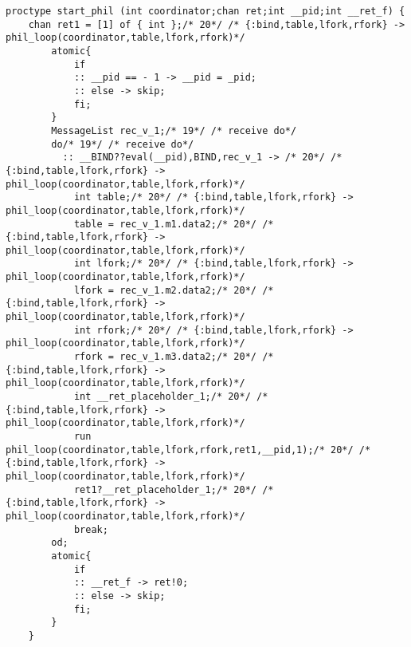 \begin{lstlisting}[xleftmargin=.001\linewidth, xrightmargin=0.001\linewidth, caption={Dining Philosophers Promela translation.}, label={lst:promela_dp}]
    proctype start_phil (int coordinator;chan ret;int __pid;int __ret_f) {
    chan ret1 = [1] of { int };/* 20*/ /* {:bind,table,lfork,rfork} -> phil_loop(coordinator,table,lfork,rfork)*/ 
        atomic{
            if
            :: __pid == - 1 -> __pid = _pid;
            :: else -> skip;
            fi;
        }
        MessageList rec_v_1;/* 19*/ /* receive do*/ 
        do/* 19*/ /* receive do*/ 
          :: __BIND??eval(__pid),BIND,rec_v_1 -> /* 20*/ /* {:bind,table,lfork,rfork} -> phil_loop(coordinator,table,lfork,rfork)*/ 
            int table;/* 20*/ /* {:bind,table,lfork,rfork} -> phil_loop(coordinator,table,lfork,rfork)*/ 
            table = rec_v_1.m1.data2;/* 20*/ /* {:bind,table,lfork,rfork} -> phil_loop(coordinator,table,lfork,rfork)*/ 
            int lfork;/* 20*/ /* {:bind,table,lfork,rfork} -> phil_loop(coordinator,table,lfork,rfork)*/ 
            lfork = rec_v_1.m2.data2;/* 20*/ /* {:bind,table,lfork,rfork} -> phil_loop(coordinator,table,lfork,rfork)*/ 
            int rfork;/* 20*/ /* {:bind,table,lfork,rfork} -> phil_loop(coordinator,table,lfork,rfork)*/ 
            rfork = rec_v_1.m3.data2;/* 20*/ /* {:bind,table,lfork,rfork} -> phil_loop(coordinator,table,lfork,rfork)*/ 
            int __ret_placeholder_1;/* 20*/ /* {:bind,table,lfork,rfork} -> phil_loop(coordinator,table,lfork,rfork)*/ 
            run phil_loop(coordinator,table,lfork,rfork,ret1,__pid,1);/* 20*/ /* {:bind,table,lfork,rfork} -> phil_loop(coordinator,table,lfork,rfork)*/ 
            ret1?__ret_placeholder_1;/* 20*/ /* {:bind,table,lfork,rfork} -> phil_loop(coordinator,table,lfork,rfork)*/ 
            break;
        od;
        atomic{
            if
            :: __ret_f -> ret!0;
            :: else -> skip;
            fi;
        }
    }
    

\end{lstlisting}
